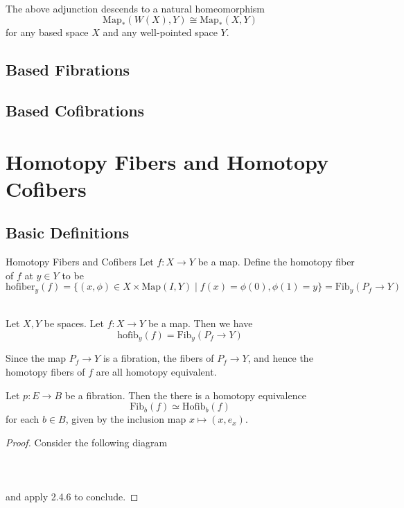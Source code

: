 \documentclass[a4paper]{article}
\begin{document}
\begin{prp}{}{}\\
The above adjunction descends to a natural homeomorphism $$\text{Map}_\ast(W(X),Y)\cong\text{Map}_\ast(X,Y)$$ for any based space $X$ and any well-pointed space $Y$. 
\end{prp}

\subsection{Based Fibrations}

\subsection{Based Cofibrations}

\pagebreak
\section{Homotopy Fibers and Homotopy Cofibers}
\subsection{Basic Definitions}
\begin{defn}{Homotopy Fibers and Cofibers}{} Let $f:X\to Y$ be a map. Define the homotopy fiber of $f$ at $y\in Y$ to be $$\text{hofiber}_y(f)=\{(x,\phi)\in X\times\text{Map}(I,Y)\;|\;f(x)=\phi(0), \phi(1)=y\}=\text{Fib}_y(P_f\to Y)$$
\end{defn}

\begin{lmm}{}{}\\
Let $X,Y$ be spaces. Let $f:X\to Y$ be a map. Then we have $$\text{hofib}_y(f)=\text{Fib}_y(P_f\to Y)$$
\end{lmm}

Since the map $P_f\to Y$ is a fibration, the fibers of $P_f\to Y$, and hence the homotopy fibers of $f$ are all homotopy equivalent. 

\begin{prp}{}{} Let $p:E\to B$ be a fibration. Then the there is a homotopy equivalence $$\text{Fib}_b(f)\simeq\text{Hofib}_b(f)$$ for each $b\in B$, given by the inclusion map $x\mapsto(x,e_x)$. 
\begin{proof}
Consider the following diagram \\~\\
 \\~\\
and apply 2.4.6 to conclude. 
\end{proof}
\end{prp}
\end{document}
